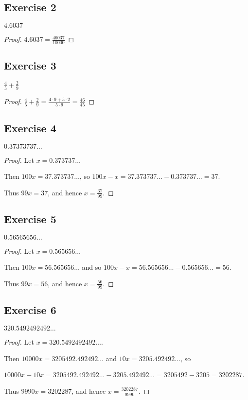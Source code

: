 \documentclass[14pt]{extarticle}
\newcommand{\dps}{\displaystyle}
\begin{document}
\subsection{Exercise 2}
$4.6037$

\begin{proof}
$4.6037 = \frac{46037}{10000}$
\end{proof}

\subsection{Exercise 3}
$\dps\frac{4}{5} + \frac{2}{9}$

\begin{proof}
$\dps\frac{4}{5} + \frac{2}{9} = \frac{4 \cdot 9 + 5 \cdot 2}{5 \cdot 9} = \frac{46}{45}$
\end{proof}

\subsection{Exercise 4}
$0.37373737\ldots$

\begin{proof}
Let $x = 0.373737\ldots$

Then $100x = 37.373737\ldots$, so $100x - x = 37.373737\ldots - 0.373737\ldots = 37$. 

Thus $99x = 37$, and hence $x = \frac{37}{99}$.
\end{proof}

\subsection{Exercise 5}
$0.56565656\ldots$

\begin{proof}
Let $x = 0.565656\ldots$ 

Then $100x = 56.565656\ldots$ and so $100x - x = 56.565656\ldots - 0.565656\ldots = 56$. 

Thus $99x = 56$, and hence $x = \frac{56}{99}$.
\end{proof}

\subsection{Exercise 6}
$320.5492492492\ldots$

\begin{proof}
Let $x = 320.5492492492\ldots$. 

Then $10000x = 3205492.492492\ldots$ and $10x = 3205.492492\ldots$, so 

$10000x - 10x = 3205492.492492 \ldots - 3205.492492\ldots = 3205492 - 3205 = 3202287$. 

Thus $9990x = 3202287$, and hence $x = \frac{3202287}{9990}$.
\end{proof}
\end{document}
